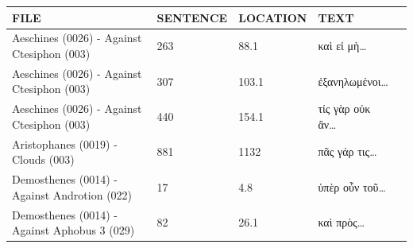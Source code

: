 \begin{tabular}[t]{lllll}
	\toprule
	FILE                                         & SENTENCE & LOCATION & TEXT                 \\
	\midrule
	Aeschines (0026) - Against Ctesiphon (003)   & 263      & 88.1     & καὶ εἰ
	μὴ\ldots{}                                                                                \\
	Aeschines (0026) - Against Ctesiphon (003)   & 307      & 103.1    &
	ἐξανηλωμένοι\ldots{}                                                                      \\
	Aeschines (0026) - Against Ctesiphon (003)   & 440      & 154.1    & τίς γὰρ
	οὐκ ἂν\ldots{}                                                                            \\
	Aristophanes (0019) - Clouds (003)           & 881      & 1132     & πᾶς γάρ
	τις\ldots{}                                                                               \\
	Demosthenes (0014) - Against Androtion (022) & 17       & 4.8      & ὑπὲρ οὖν τοῦ\ldots{} \\
	Demosthenes (0014) - Against Aphobus 3 (029) & 82       & 26.1     & καὶ πρὸς\ldots{}     \\
	\bottomrule
\end{tabular}
